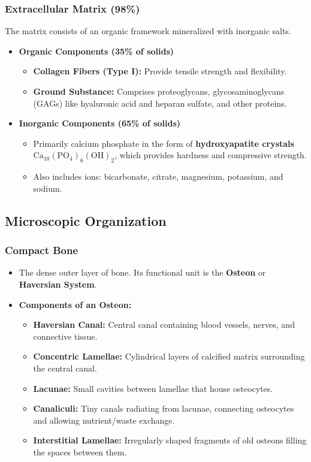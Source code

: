 \documentclass[11pt]{article}
\begin{document}
\subsubsection*{Extracellular Matrix (98\%)}
The matrix consists of an organic framework mineralized with inorganic salts.
\begin{itemize}
    \item \textbf{Organic Components (35\% of solids)}
    \begin{itemize}
        \item \textbf{Collagen Fibers (Type I):} Provide tensile strength and flexibility.
        \item \textbf{Ground Substance:} Comprises proteoglycans, glycosaminoglycans (GAGs) like hyaluronic acid and heparan sulfate, and other proteins.
    \end{itemize}
    
    \item \textbf{Inorganic Components (65\% of solids)}
    \begin{itemize}
        \item Primarily calcium phosphate in the form of \textbf{hydroxyapatite crystals} $\text{Ca}_{10}(\text{PO}_4)_6(\text{OH})_2$, which provides hardness and compressive strength.
        \item Also includes ions: bicarbonate, citrate, magnesium, potassium, and sodium.
    \end{itemize}
\end{itemize}

\subsection{Microscopic Organization}

\subsubsection*{Compact Bone}
\begin{itemize}
    \item The dense outer layer of bone. Its functional unit is the \textbf{Osteon} or \textbf{Haversian System}.
    \item \textbf{Components of an Osteon:}
    \begin{itemize}
        \item \textbf{Haversian Canal:} Central canal containing blood vessels, nerves, and connective tissue.
        \item \textbf{Concentric Lamellae:} Cylindrical layers of calcified matrix surrounding the central canal.
        \item \textbf{Lacunae:} Small cavities between lamellae that house osteocytes.
        \item \textbf{Canaliculi:} Tiny canals radiating from lacunae, connecting osteocytes and allowing nutrient/waste exchange.
        \item \textbf{Interstitial Lamellae:} Irregularly shaped fragments of old osteons filling the spaces between them.
    \end{itemize}
\end{itemize}
\end{document}
